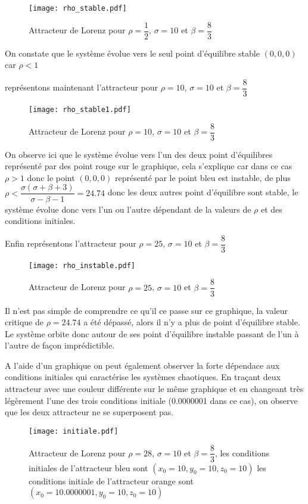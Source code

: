 \begin{figure}
    \texttt{[image: rho\_stable.pdf]}
    \caption{Attracteur de Lorenz pour $\rho=\dfrac{1}{2}$, $\sigma=10$ et $\beta=\dfrac{8}{3}$} 
\end{figure}
On constate que le système évolue vers le seul point d'équilibre stable $(0,0,0)$ car $\rho<1$

représentons maintenant l'attracteur pour $\rho=10$, $\sigma=10$ et $\beta=\dfrac{8}{3}$

\begin{figure}
    \texttt{[image: rho\_stable1.pdf]}
    \caption{Attracteur de Lorenz pour $\rho=10$, $\sigma=10$ et $\beta=\dfrac{8}{3}$} 
\end{figure}

On observe ici que le système évolue vers l'un des deux point d'équilibres représenté par des point rouge sur le graphique, cela s'explique car dans ce cas $\rho>1$ donc le point $(0,0,0)$ représenté par le point bleu est instable, de plus $\rho < \dfrac{\sigma(\sigma+\beta+3)}{\sigma-\beta-1}=24.74$ donc les deux autres point d'équilibre sont stable, le système évolue donc vers l'un ou l'autre dépendant de la valeurs de $\rho$ et des conditions initiales.  

Enfin représentons l'attracteur pour $\rho=25$, $\sigma=10$ et $\beta=\dfrac{8}{3}$

\begin{figure}
    \texttt{[image: rho\_instable.pdf]}
    \caption{Attracteur de Lorenz pour $\rho=25$, $\sigma=10$ et $\beta=\dfrac{8}{3}$} 
\end{figure}

Il n'est pas simple de comprendre ce qu'il ce passe sur ce graphique, la valeur critique de $\rho=24.74$ a été dépassé, alors il n'y a plus de point d'équilibre stable. Le système orbite donc autour de ses point d'équilibre instable passant de l'un à l'autre de façon imprédictible.

A l'aide d'un graphique on peut également observer la forte dépendace aux conditions initiales qui caractérise les systèmes chaotiques. En traçant deux attracteur avec une couleur différente sur le même graphique et en changeant très légèrement l'une des trois conditions initiale (0.0000001 dans ce cas), on observe que les deux attracteur ne se superposent pas.

\begin{figure}
    \texttt{[image: initiale.pdf]}
    \caption{Attracteur de Lorenz pour $\rho=28$, $\sigma=10$ et $\beta=\dfrac{8}{3}$, les conditions initiales de l'attracteur bleu sont $(x_0=10,y_0=10,z_0=10)$ les conditions initiale de l'attracteur orange sont $(x_0=10.0000001,y_0=10,z_0=10)$} 
\end{figure}

